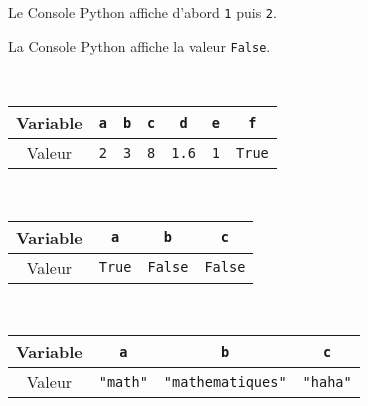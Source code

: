 




\chapter{}

\begin{correction}
	Le Console Python affiche d'abord \texttt{1} puis \texttt{2}.
\end{correction}

\begin{correction}
	La Console Python affiche la valeur \texttt{False}.
\end{correction}

\begin{correction}~
	\begin{center}
		\begin{tabular}{|c|c|c|c|c|c|c|}
			\hline
			Variable &\texttt{a}&\texttt{b}&\texttt{c}&\texttt{d}&\texttt{e}&\texttt{f}\\\hline
			Valeur &\texttt{2}&\texttt{3}&\texttt{8}&\texttt{1.6}&\texttt{1}&\texttt{True}\\\hline
		\end{tabular}
	\end{center}
\end{correction}

\begin{correction}~
	\begin{center}
		\begin{tabular}{|c|c|c|c|}
			\hline
			Variable &\texttt{a}&\texttt{b}&\texttt{c}\\\hline
			Valeur &\texttt{True}&\texttt{False}&\texttt{False}\\\hline
		\end{tabular}
	\end{center}
\end{correction}

\begin{correction}~
	\begin{center}
		\begin{tabular}{|c|c|c|c|}
			\hline
			Variable &\texttt{a}&\texttt{b}&\texttt{c}\\\hline
			Valeur &\texttt{"math"}&\texttt{"mathematiques"}&\texttt{"haha"}\\\hline
		\end{tabular}
	\end{center}
\end{correction}

